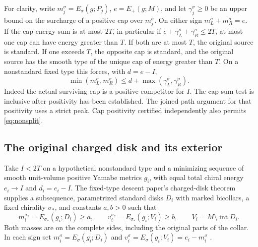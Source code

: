 \documentclass[11pt,letterpaper]{article}
\numberwithin{equation}{section}
\theoremstyle{remark}
\DeclareMathOperator{\intt}{int}
\begin{document}
For clarity, write \(m_j^\sigma=E_\sigma(g;P_j)\),
\(e=E_+(g;M)\), and let \(\gamma_j^\sigma\ge0\) be
an upper bound on the surcharge of a positive cap
over \(m_j^\sigma\). On either sign \(m_L^\sigma+
m_R^\sigma=e\). If the cap energy sum is at most \(2T\),
in particular if \(e+\gamma_L^\sigma+\gamma_R^\sigma\le2T\),
at most one cap can have energy greater than \(T\).
If both are at most \(T\), the original source is
standard. If one exceeds \(T\), the opposite cap is standard,
and the original source has the smooth type of the unique cap
of energy greater than \(T\). On a nonstandard fixed type this forces,
with \(d=e-I\),
\begin{equation}\label{eq:nonsplit}
 \min(m_L^\sigma,m_R^\sigma)
 \le d+\max(\gamma_L^\sigma,\gamma_R^\sigma).
\end{equation}
Indeed the actual surviving cap is a positive
competitor for \(I\). The cap sum test is inclusive
after positivity has been established. The joined
path argument for that positivity uses a strict peak.
Cap positivity certified independently also permits
\eqref{eq:nonsplit}.

\subsection{The original charged disk and its exterior}
Take \(I<2T\) on a hypothetical nonstandard type and
a minimizing sequence of smooth unit-volume positive
Yamabe metrics \(g_i\), with equal total chiral energy
\(e_i\to I\) and \(d_i=e_i-I\). The fixed-type descent paper's charged-disk
theorem supplies a subsequence, parametrized standard
disks \(D_i\) with marked bicollars, a fixed chirality
\(\sigma_*\), and constants \(a,b>0\) such that
\begin{equation}\label{eq:charge}
 m_i^{\sigma_*}=E_{\sigma_*}(g_i;D_i)\ge a,\qquad
 v_i^{\sigma_*}=E_{\sigma_*}(g_i;V_i)\ge b,\qquad
 V_i=M\setminus\intt D_i .
\end{equation}
Both masses are on the complete sides, including the
original parts of the collar. In each sign set
\(m_i^\sigma=E_\sigma(g_i;D_i)\) and
\(v_i^\sigma=E_\sigma(g_i;V_i)=e_i-m_i^\sigma\)
\cite[A comparison scale carrying diffuse Weyl curvature]{Baker2026FixedDescent}.
\end{document}
